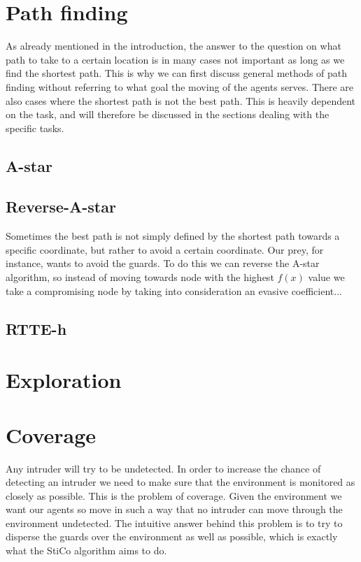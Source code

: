 \documentclass{apa6}
\begin{document}
\section{Path finding}
		As already mentioned in the introduction, the answer to the question on what path to take to a certain location is in many cases not important as long as we find the shortest path. This is why we can first discuss general methods of path finding without referring to what goal the moving of the agents serves. There are also cases where the shortest path is not the best path. This is heavily dependent on the task, and will therefore be discussed in the sections dealing with the specific tasks.

    \subsection{A-star}
		
		
	\subsection{Reverse-A-star}
	Sometimes the best path is not simply defined by the shortest path towards a specific coordinate, but rather to avoid a certain coordinate. Our prey, for instance, wants to avoid the guards. To do this we can reverse the A-star algorithm, so instead of moving towards node with the highest $f(x)$ value we take a compromising node by taking into consideration an evasive coefficient... 

	\subsection{RTTE-h}
		

	\section{Exploration}

	\section{Coverage}
	Any intruder will try to be undetected. In order to increase the chance of detecting an intruder we need to make sure that the environment is monitored as closely as possible. This is the problem of coverage. Given the environment we want our agents so move in such a way that no intruder can move through the environment undetected. The intuitive answer behind this problem is to try to disperse the guards over the environment as well as possible, which is exactly what the StiCo algorithm aims to do.
	
\end{document}
